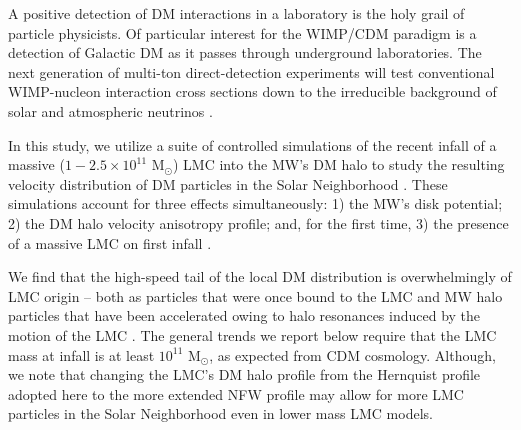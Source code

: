 \documentclass[letterpaper,11pt]{article}
\begin{document}
A positive detection of DM interactions in a laboratory is the holy grail of particle physicists.  Of particular interest for the WIMP/CDM paradigm is a detection of Galactic DM as it passes through underground laboratories.  The next generation of multi-ton direct-detection experiments will test conventional WIMP-nucleon interaction cross sections down to the irreducible background of solar and atmospheric neutrinos \cite{Cushman:2013}.  


In this study, we utilize a suite of controlled simulations of the recent infall of a massive ($1-2.5 \times 10^{11}$ M$_\odot$) LMC into the MW's DM halo to study the resulting velocity distribution of DM particles in the Solar Neighborhood \cite{G19}. These simulations account for three effects simultaneously: 1) the MW's disk potential; 2) the DM halo velocity anisotropy profile; and, for the first time, 3) the presence of a massive LMC on first infall \cite{Besla:2007,Besla:2010}. 


We find that the high-speed tail of the local DM distribution is 
overwhelmingly of LMC origin -- both as particles that were once bound to the LMC and 
MW halo particles that have been accelerated owing to halo resonances induced by 
the motion of the LMC \cite{G19}. 
The general trends we report below require that
the LMC mass at infall is at least $10^{11}$ M$_\odot$, as expected from CDM cosmology. 
Although, we note that changing the LMC's DM halo profile from the Hernquist profile adopted here 
to the more extended NFW profile may allow for more LMC particles in the Solar Neighborhood even in lower mass LMC models.
\end{document}
